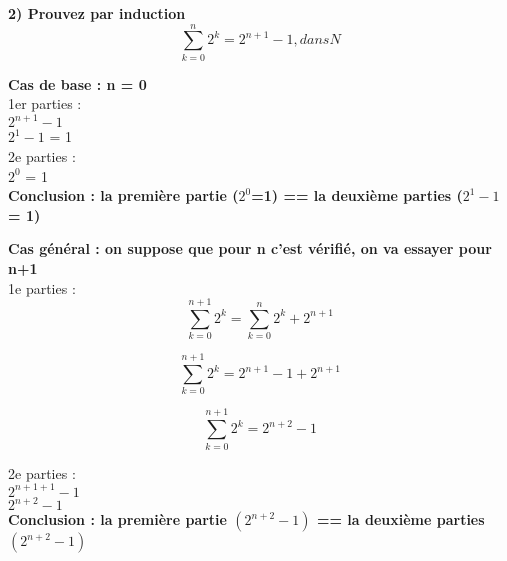 \newpage

\textbf{2) Prouvez par induction} \\

\[
  \sum_{k=0}^{n} 2^{k} = 2^{n+1}-1, dans N
\]

\textbf{Cas de base : n = 0} \\

1er parties : \\

$2^{n+1}-1$ \\
$2^{1}-1$ = 1 \\

2e parties : \\

$2^{0}$ = 1 \\

\textbf{Conclusion : la première partie ($2^{0}$=1) == la deuxième parties ($2^{1}-1$ = 1)} \\

\vspace{6mm}

\textbf{Cas général : on suppose que pour n c'est vérifié, on va essayer pour n+1 } \\

1e parties : \\

\[
  \sum_{k=0}^{n+1} 2^{k} =
  \sum_{k=0}^{n} 2^{k} + 2^{n+1}
\]

\[
  \sum_{k=0}^{n+1} 2^{k} = 2^{n+1}-1 + 2^{n+1}
\]

\[
  \sum_{k=0}^{n+1} 2^{k} = 2^{n+2}-1
\]


2e parties : \\

$2^{n+1+1}-1$ \\
$2^{n+2}-1$ \\

\textbf{Conclusion : la première partie $(2^{n+2}-1)$ == la deuxième parties $(2^{n+2}-1)$} \\

\newpage
